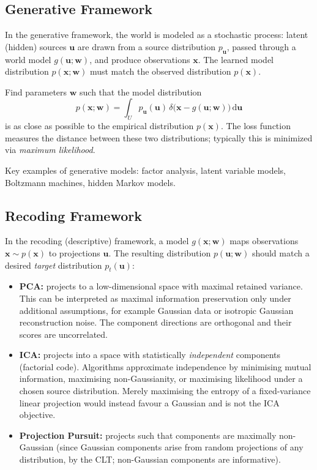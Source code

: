 \documentclass[11pt, oneside]{book}
\newcommand{\dd}{\,\mathrm{d}}
\newcommand{\wvec}{\bm{w}}
\newcommand{\xvec}{\bm{x}}
\newcommand{\uvec}{\bm{u}}
\begin{document}
\subsection{Generative Framework}

In the generative framework, the world is modeled as a stochastic process:
latent (hidden) sources $\uvec$ are drawn from a source distribution $p_{\uvec}$,
passed through a world model $g(\uvec;\wvec)$, and produce observations $\xvec$.
The learned model distribution $p(\xvec;\wvec)$ must match the observed distribution $p(\xvec)$.

\begin{thmbox}[title={Generative Model Objective}]
Find parameters $\wvec$ such that the model distribution
\[
  p(\xvec;\wvec) = \int_U p_{\uvec}(\uvec)\,\delta\!\bigl(\xvec-g(\uvec;\wvec)\bigr)\dd\uvec
\]
is as close as possible to the empirical distribution $p(\xvec)$.
The loss function measures the distance between these two distributions; typically this
is minimized via \emph{maximum likelihood}.
\end{thmbox}

Key examples of generative models: factor analysis, latent variable models,
Boltzmann machines, hidden Markov models.

\subsection{Recoding Framework}

In the recoding (descriptive) framework, a model $g(\xvec;\wvec)$ maps observations
$\xvec \sim p(\xvec)$ to projections $\uvec$.
The resulting distribution $p(\uvec;\wvec)$ should match a desired \emph{target}
distribution $p_t(\uvec)$:

\begin{itemize}
  \item \textbf{PCA:} projects to a low-dimensional space with maximal retained variance.
        This can be interpreted as maximal information preservation only under additional
        assumptions, for example Gaussian data or isotropic Gaussian reconstruction noise.
        The component directions are orthogonal and their scores are uncorrelated.

  \item \textbf{ICA:} projects into a space with statistically \emph{independent}
        components (factorial code). Algorithms approximate independence by minimising
        mutual information, maximising non-Gaussianity, or maximising likelihood under a
        chosen source distribution. Merely maximising the entropy of a fixed-variance
        linear projection would instead favour a Gaussian and is not the ICA objective.

  \item \textbf{Projection Pursuit:} projects such that components are maximally
        non-Gaussian (since Gaussian components arise from random projections of any
        distribution, by the CLT; non-Gaussian components are informative).
\end{itemize}
\end{document}
